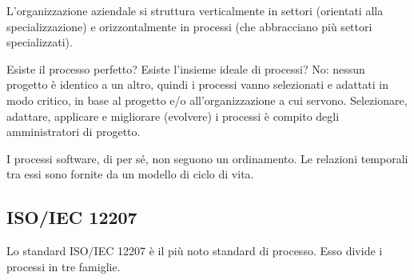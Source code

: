 \documentclass[a4paper]{article}
\begin{document}
		
L'organizzazione aziendale si struttura verticalmente in settori (orientati alla specializzazione) e orizzontalmente in processi (che abbracciano più settori specializzati).
		
Esiste il processo perfetto? Esiste l'insieme ideale di processi? No: nessun progetto è identico a un altro, quindi i processi vanno selezionati e adattati in modo critico, in base al progetto e/o all'organizzazione a cui servono. Selezionare, adattare, applicare e migliorare (evolvere) i processi è compito degli amministratori di progetto.
		
I processi software, di per sé, non seguono un ordinamento. Le relazioni temporali tra essi sono fornite da un modello di ciclo di vita.

		
	\subsection{ISO/IEC 12207}

		
Lo standard ISO/IEC 12207 è il più noto standard di processo. Esso divide i processi in tre famiglie.
		
\end{document}

